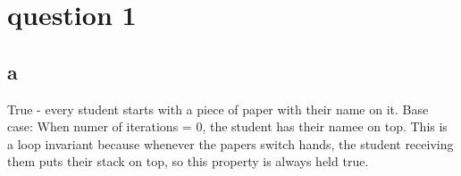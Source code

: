 \section*{question 1}
\subsection*{a}
True - every student starts with a piece of paper with their name on it. Base case: When numer of iterations = 0, the student has their namee on top. This is a loop invariant because whenever the papers switch hands, the student receiving them puts their stack on top, so this property is always held true.
